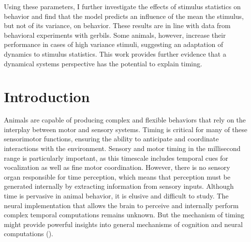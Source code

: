 \documentclass[10pt, a4paper]{article}
\begin{document}
Using these parameters, I further investigate the effects of stimulus statistics on behavior and find that the model predicts an influence of the mean the stimulus, but not of its variance, on behavior.
These results are in line with data from behavioral experiments with gerbils. Some animals, however, increase their performance in cases of high variance stimuli, suggesting an adaptation of dynamics to stimulus statistics.
This work provides further evidence that a dynamical systems perspective has the potential to explain timing.



\pagebreak
\tableofcontents
\pagebreak

{}
\section{Introduction}
Animals are capable of producing complex and flexible behaviors that rely on the interplay between motor and sensory systems.
Timing is critical for many of these sensorimotor functions, ensuring the ability to anticipate and coordinate interactions with the environment.
Sensory and motor timing in the millisecond range is particularly important, as this timescale includes temporal cues for vocalization as well as fine motor coordination.
However, there is no sensory organ responsible for time perception, which means that perception must be generated internally by extracting information from sensory inputs.
Although time is pervasive in animal behavior, it is elusive and difficult to study. The neural implementation that allows the brain to perceive and internally perform complex temporal computations remains unknown.
But the mechanism of timing might provide powerful insights into general mechanisms of cognition and neural computations (\cite{Issa2020}).
\end{document}
